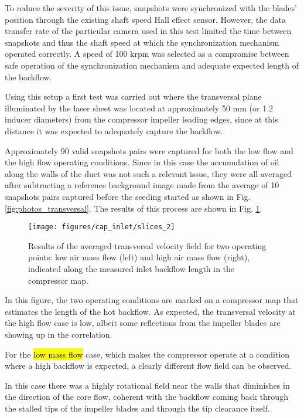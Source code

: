 To reduce the severity of this issue, snapshots were synchronized with the blades' position through the existing shaft speed Hall effect sensor. However, the data transfer rate of the particular camera used in this test limited the time between snapshots and thus the shaft speed at which the synchronization mechanism operated correctly. A speed of 100 krpm was selected as a compromise between safe operation of the synchronization mechanism and adequate expected length of the backflow.

Using this setup a first test was carried out where the transversal plane illuminated by the laser sheet was located at approximately 50 mm (or 1.2 inducer diameters) from the compressor impeller leading edges, since at this distance it was expected to adequately capture the backflow. 

Approximately 90 valid snapshots pairs were captured for both the low flow and the high flow operating conditions. Since in this case the accumulation of oil along the walls of the duct was not such a relevant issue, they were all averaged after subtracting a reference background image made from the average of 10 snapshots pairs captured before the seeding started as shown in Fig. \ref{fig:photos_transversal}. The results of this process are shown in Fig. \ref{fig:slices_2}.

\begin{figure}[thb!]
\hspace{-0.1\textwidth}
\texttt{[image: figures/cap\_inlet/slices\_2]}
\caption{Results of the averaged transversal velocity field for two operating points: low air mass flow (left) and high air mass flow (right), indicated along the measured inlet backflow length in the compressor map.}
\label{fig:slices_2}
\end{figure}

In this figure, the two operating conditions are marked on a compressor map that estimates the length of the hot backflow. As expected, the transversal velocity at the high flow case is low, albeit some reflections from the impeller blades are showing up in the correlation.

For the \hl{low mass flow} case, which makes the compressor operate at a condition where a high backflow is expected, a clearly different flow field can be observed. 

In this case there was a highly rotational field near the walls that diminishes in the direction of the core flow, coherent with the backflow coming back through the stalled tips of the impeller blades and through the tip clearance itself.

